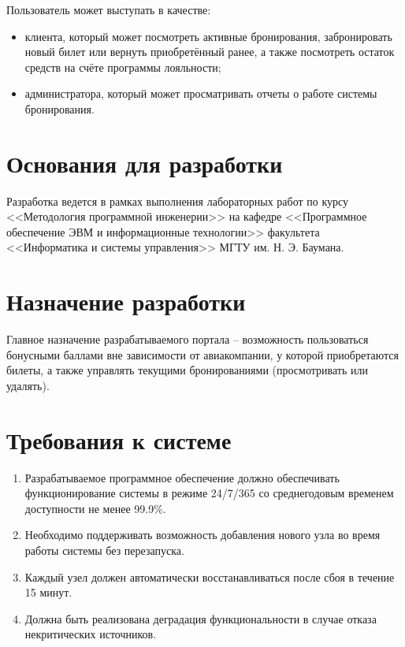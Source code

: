 Пользователь может выступать в качестве:
\begin{itemize}
    \item клиента, который может посмотреть активные бронирования, забронировать новый билет или вернуть приобретённый ранее, а также посмотреть остаток средств на счёте программы лояльности;
    \item администратора, который может просматривать отчеты о работе системы бронирования.
\end{itemize}

\section*{Основания для разработки}

Разработка ведется в рамках выполнения лабораторных работ по курсу <<Методология программной инженерии>> на кафедре <<Программное обеспечение ЭВМ и информационные технологии>> факультета <<Информатика и системы управления>> МГТУ им. Н. Э. Баумана.


\section*{Назначение разработки}

Главное назначение разрабатываемого портала -- возможность пользоваться бонусными баллами вне зависимости от авиакомпании, у которой приобретаются билеты, а также управлять текущими бронированиями (просмотривать или удалять).

\section*{Требования к системе}

\begin{enumerate}
    \item  Разрабатываемое программное обеспечение должно обеспечивать функционирование системы в режиме 24/7/365 со среднегодовым временем доступности не менее 99.9\%.
	\item Необходимо поддерживать возможность добавления нового
	узла во время работы системы без перезапуска.
	\item Каждый узел должен автоматически восстанавливаться после сбоя в течение 15 минут.
    \item Должна быть реализована деградация функциональности в случае отказа некритических источников.
\end{enumerate}

